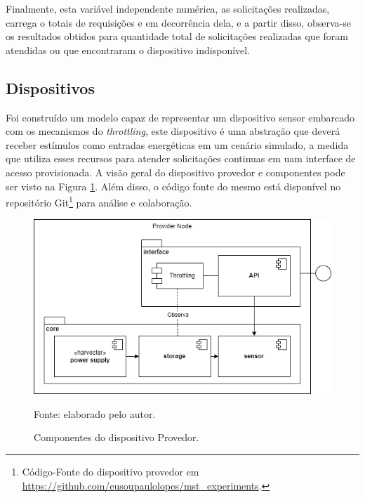 Finalmente, esta variável independente numérica, as solicitações realizadas, carrega o totais de requisições e em decorrência dela, e a partir disso, observa-se os resultados obtidos para  quantidade total de solicitações realizadas que foram atendidas ou que encontraram o dispositivo indisponível.


\subsection{Dispositivos}

Foi construído um modelo capaz de representar um dispositivo sensor embarcado com os mecanismos do \textit{throttling}, este dispositivo é uma abstração que deverá receber estímulos como entradas energéticas em um cenário simulado, a medida que utiliza esses recursos para atender solicitações continuas em uam interface de acesso provisionada. A visão geral do dispositivo provedor e componentes pode ser visto na Figura \ref{fig:cap6providernode}. Além disso, o código fonte do mesmo está disponível no repositório Git\footnote{Código-Fonte do dispositivo provedor em \url{https://github.com/eusoupaulolopes/mst_experiments}.}  para análise e colaboração.

\begin{figure}[H]
	\centering
	
	\caption{Componentes do dispositivo Provedor.}
	\label{fig:cap6providernode}
	\noindent\includegraphics[width=0.75\linewidth]{Imagens/cap6/cap6providernode.png} 
	
	Fonte: elaborado pelo autor.
\end{figure}


